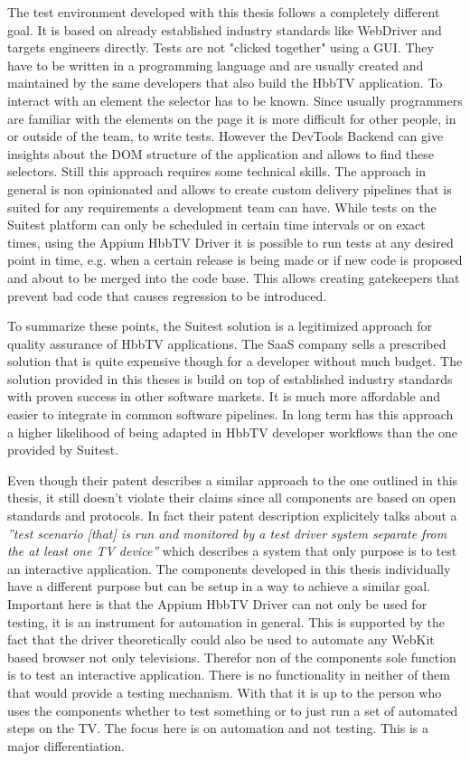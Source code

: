 The test environment developed with this thesis follows a completely different goal. It is based on already established industry standards like WebDriver and targets engineers directly. Tests are not "clicked together" using a GUI. They have to be written in a programming language and are usually created and maintained by the same developers that also build the HbbTV application. To interact with an element the selector has to be known. Since usually programmers are familiar with the elements on the page it is more difficult for other people, in or outside of the team, to write tests. However the DevTools Backend can give insights about the DOM structure of the application and allows to find these selectors. Still this approach requires some technical skills. The approach in general is non opinionated and allows to create custom delivery pipelines that is suited for any requirements a development team can have. While tests on the Suitest platform can only be scheduled in certain time intervals or on exact times, using the Appium HbbTV Driver it is possible to run tests at any desired point in time, e.g. when a certain release is being made or if new code is proposed and about to be merged into the code base. This allows creating gatekeepers that prevent bad code that causes regression to be introduced.

To summarize these points, the Suitest solution is a legitimized approach for quality assurance of HbbTV applications. The SaaS company sells a prescribed solution that is quite expensive though for a developer without much budget. The solution provided in this theses is build on top of established industry standards with proven success in other software markets. It is much more affordable and easier to integrate in common software pipelines. In long term has this approach a higher likelihood of being adapted in HbbTV developer workflows than the one provided by Suitest.

Even though their patent describes a similar approach to the one outlined in this thesis, it still doesn't violate their claims since all components are based on open standards and protocols. In fact their patent description explicitely talks about a \textit{''test scenario [that] is run and monitored by a test driver system separate from the at least one TV device''} \cite{krocek2016method} which describes a system that only purpose is to test an interactive application. The components developed in this thesis individually have a different purpose but can be setup in a way to achieve a similar goal. Important here is that the Appium HbbTV Driver can not only be used for testing, it is an instrument for automation in general. This is supported by the fact that the driver theoretically could also be used to automate any WebKit based browser not only televisions. Therefor non of the components sole function is to test an interactive application. There is no functionality in neither of them that would provide a testing mechanism. With that it is up to the person who uses the components whether to test something or to just run a set of automated steps on the TV. The focus here is on automation and not testing. This is a major differentiation.
